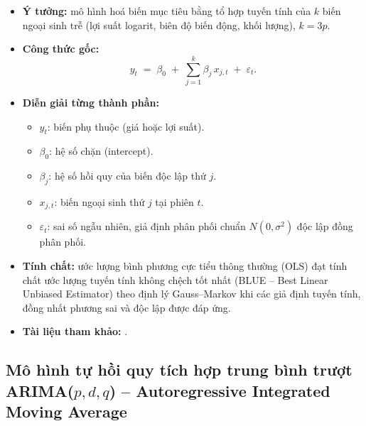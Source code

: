 \documentclass[12pt,a4paper,openany,oneside]{report}
\numberwithin{equation}{chapter}
\begin{document}
\begin{itemize}[leftmargin=18pt,topsep=2pt,itemsep=4pt]
  \item \textbf{Ý tưởng:} mô hình hoá biến mục tiêu bằng tổ hợp tuyến
        tính của $k$ biến ngoại sinh trễ (lợi suất logarit, biên độ
        biến động, khối lượng), $k = 3p$.
  \item \textbf{Công thức gốc:}
        \begin{equation}
          y_t \;=\; \beta_0 \;+\; \sum_{j=1}^{k}\beta_j\, x_{j,t}
          \;+\; \varepsilon_t.
          \label{eq:mlr}
        \end{equation}
  \item \textbf{Diễn giải từng thành phần:}
        \begin{itemize}[leftmargin=14pt,topsep=2pt,itemsep=1pt]
          \item $y_t$: biến phụ thuộc (giá hoặc lợi suất).
          \item $\beta_0$: hệ số chặn (intercept).
          \item $\beta_j$: hệ số hồi quy của biến độc lập thứ $j$.
          \item $x_{j,t}$: biến ngoại sinh thứ $j$ tại phiên $t$.
          \item $\varepsilon_t$: sai số ngẫu nhiên, giả định phân phối
                chuẩn $N(0,\sigma^2)$ độc lập đồng phân phối.
        \end{itemize}
  \item \textbf{Tính chất:} ước lượng bình phương cực tiểu thông thường
        (OLS) đạt tính chất ước lượng tuyến tính không chệch tốt nhất
        (BLUE -- Best Linear Unbiased Estimator) theo định lý
        Gauss--Markov khi các giả định tuyến tính, đồng nhất phương sai
        và độc lập được đáp ứng.
  \item \textbf{Tài liệu tham khảo:} \citet{Greene2018}.
\end{itemize}

\subsection{Mô hình tự hồi quy tích hợp trung bình trượt ARIMA($p,d,q$) -- Autoregressive Integrated Moving Average}
\end{document}
